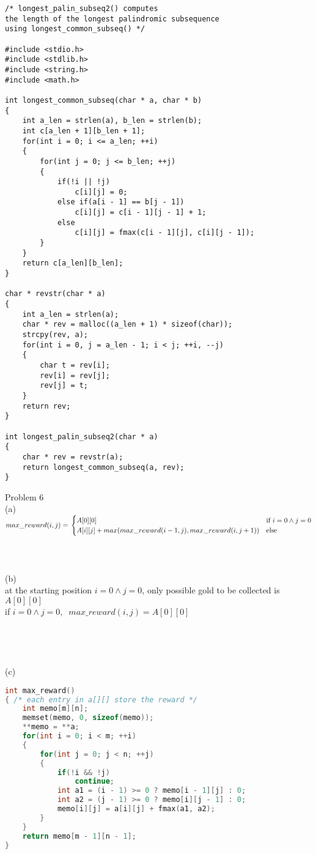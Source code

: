 \documentclass[12pt,border=4pt,multi]{article}%
\begin{document}
\begin{lstlisting}
/* longest_palin_subseq2() computes 
the length of the longest palindromic subsequence
using longest_common_subseq() */

#include <stdio.h>
#include <stdlib.h>
#include <string.h>
#include <math.h>

int longest_common_subseq(char * a, char * b)
{
    int a_len = strlen(a), b_len = strlen(b);
    int c[a_len + 1][b_len + 1];
    for(int i = 0; i <= a_len; ++i)
    {
        for(int j = 0; j <= b_len; ++j)
        {
            if(!i || !j)
                c[i][j] = 0;
            else if(a[i - 1] == b[j - 1])
                c[i][j] = c[i - 1][j - 1] + 1;
            else
                c[i][j] = fmax(c[i - 1][j], c[i][j - 1]);
        }
    }
    return c[a_len][b_len];
}

char * revstr(char * a)
{
    int a_len = strlen(a);
    char * rev = malloc((a_len + 1) * sizeof(char));
    strcpy(rev, a);
    for(int i = 0, j = a_len - 1; i < j; ++i, --j)
    {
        char t = rev[i];
        rev[i] = rev[j];
        rev[j] = t;
    }
    return rev;
}

int longest_palin_subseq2(char * a)
{
    char * rev = revstr(a);
    return longest_common_subseq(a, rev);
}
\end{lstlisting}
\newpage
\noindent
Problem 6\\
(a)\\
$max\_reward(i, j) =\\
\begin{cases}
A[0][0] & \text{if } i = 0 \wedge j = 0\\
A[i][j] + max(max\_reward(i - 1, j), max\_reward(i, j + 1)) & \text{else}\\
\end{cases}$
\\
\\
\\
\\
(b)\\
at the starting position $i = 0 \wedge j = 0$, only possible gold to be collected is $A[0][0]$\\
if $i = 0 \wedge j = 0,\;\; max\_reward(i, j) = A[0][0]$\\ 
\\
\\
\\
\\
(c)
\begin{lstlisting}[language = c]
int max_reward()
{ /* each entry in a[][] store the reward */
    int memo[m][n];
    memset(memo, 0, sizeof(memo));
    **memo = **a;
    for(int i = 0; i < m; ++i)
    {
        for(int j = 0; j < n; ++j)
        {
            if(!i && !j)
                continue;
            int a1 = (i - 1) >= 0 ? memo[i - 1][j] : 0;
            int a2 = (j - 1) >= 0 ? memo[i][j - 1] : 0;
            memo[i][j] = a[i][j] + fmax(a1, a2);
        }
    }
    return memo[m - 1][n - 1];
}
\end{lstlisting}
\end{document}
